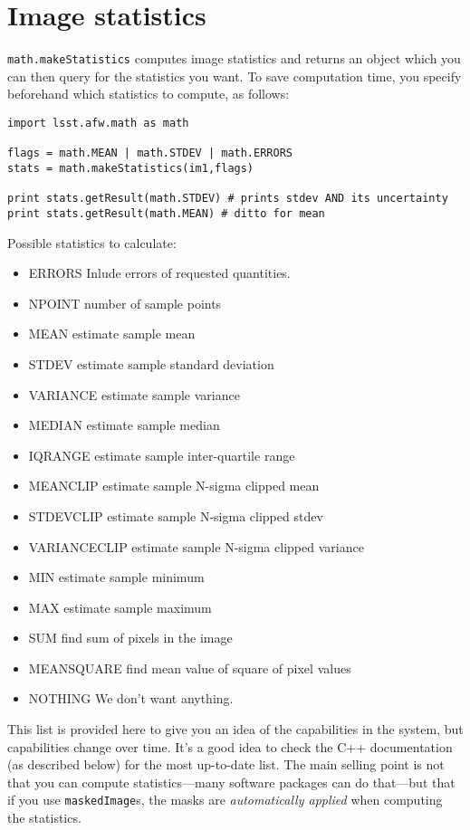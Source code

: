 \documentclass{book}
\begin{document}
\section{Image statistics}

\texttt{math.makeStatistics} computes image statistics and returns an
object which you can then query for the statistics you want.  To save
computation time, you specify beforehand which statistics to compute,
as follows:

\begin{verbatim}
import lsst.afw.math as math

flags = math.MEAN | math.STDEV | math.ERRORS 
stats = math.makeStatistics(im1,flags)

print stats.getResult(math.STDEV) # prints stdev AND its uncertainty
print stats.getResult(math.MEAN) # ditto for mean

\end{verbatim}

Possible statistics to calculate:
\begin{itemize}
\item ERRORS     Inlude errors of requested quantities.
\item NPOINT     number of sample points
\item MEAN     estimate sample mean
\item STDEV     estimate sample standard deviation
\item VARIANCE     estimate sample variance
\item MEDIAN     estimate sample median
\item IQRANGE     estimate sample inter-quartile range
\item MEANCLIP     estimate sample N-sigma clipped mean
\item STDEVCLIP     estimate sample N-sigma clipped stdev
\item VARIANCECLIP     estimate sample N-sigma clipped variance
\item MIN     estimate sample minimum
\item MAX     estimate sample maximum
\item SUM     find sum of pixels in the image
\item MEANSQUARE     find mean value of square of pixel values
\item NOTHING     We don't want anything.
\end{itemize}

This list is provided here to give you an idea of the capabilities in
the system, but capabilities change over time.  It's a good idea to
check the C++ documentation (as described below) for the most
up-to-date list.  The main selling point is not that you can compute
statistics---many software packages can do that---but that if you use
\texttt{maskedImage}s, the masks are {\it automatically applied} when
computing the statistics.
\end{document}
